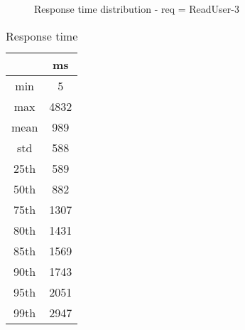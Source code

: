 \begin{minipage}{0.75\linewidth}
\begin{figure}[h]
\begin{adjustbox}{max width=1.0\linewidth, keepaspectratio}
  \end{adjustbox}
  \caption{Response time distribution - req = ReadUser-3}
\end{figure}
\end{minipage}\hfill\begin{minipage}{0.18\linewidth}
\begin{table}[h]
\begin{tabular}{|cc|}
\hline
\textbf{} & \textbf{ms}\\ \hline
 \Xhline{0.005\arrayrulewidth}
min & 5\\
 \Xhline{0.005\arrayrulewidth}
max & 4832\\
 \Xhline{0.005\arrayrulewidth}
mean & 989\\
 \Xhline{0.005\arrayrulewidth}
std & 588\\
\hline
\hline
 \Xhline{0.005\arrayrulewidth}
25th & 589\\
 \Xhline{0.005\arrayrulewidth}
50th & 882\\
 \Xhline{0.005\arrayrulewidth}
75th & 1307\\
 \Xhline{0.005\arrayrulewidth}
80th & 1431\\
 \Xhline{0.005\arrayrulewidth}
85th & 1569\\
 \Xhline{0.005\arrayrulewidth}
90th & 1743\\
 \Xhline{0.005\arrayrulewidth}
95th & 2051\\
 \Xhline{0.005\arrayrulewidth}
99th & 2947\\
\hline
\end{tabular}
\caption{Response time}
\end{table}
\end{minipage}\hfill